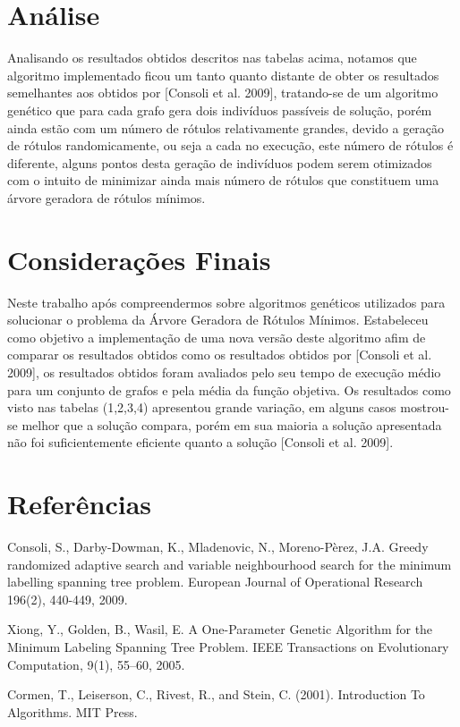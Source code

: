 \documentclass[12pt]{article}
\begin{document}
	\section{Análise}\label{sec:conclusao}

	Analisando os resultados obtidos descritos nas tabelas acima, notamos que algoritmo implementado ficou um tanto quanto distante de obter os resultados semelhantes aos obtidos por [Consoli et al. 2009], tratando-se de um algoritmo genético que para cada grafo gera dois indivíduos passíveis de solução, porém ainda estão com um número de rótulos relativamente grandes, devido a geração de rótulos randomicamente, ou seja a cada no execução, este número de rótulos é diferente, alguns pontos desta geração de indivíduos podem serem otimizados com o intuito de minimizar ainda mais número de rótulos que constituem uma árvore geradora de rótulos mínimos.

				
	\section{Considerações Finais}\label{sec:conclusao}

		Neste trabalho após compreendermos sobre algoritmos genéticos utilizados para solucionar o problema da Árvore Geradora de Rótulos Mínimos. Estabeleceu como objetivo a implementação de uma nova versão deste algoritmo afim de comparar os resultados obtidos como os resultados obtidos por [Consoli et al. 2009], os resultados obtidos foram avaliados pelo seu tempo de execução médio para um conjunto de grafos e pela média da função objetiva. Os resultados como visto nas tabelas (1,2,3,4) apresentou grande variação, em alguns casos mostrou-se melhor que a solução compara, porém em sua maioria a solução apresentada não foi suficientemente eficiente quanto a solução [Consoli et al. 2009]. 

	\section{Referências}\label{sec:referencias}

		\noindent [5] Consoli, S., Darby-Dowman, K., Mladenovic, N., Moreno-Pèrez, J.A. Greedy randomized adaptive search and variable neighbourhood search for the minimum labelling spanning tree problem. European Journal of Operational
		Research 196(2), 440-449, 2009.
		
		\noindent Xiong, Y., Golden, B., Wasil, E. A One-Parameter Genetic Algorithm for the Minimum Labeling Spanning Tree Problem. IEEE Transactions on Evolutionary Computation, 9(1), 55–60, 2005.

		\noindent Cormen, T., Leiserson, C., Rivest, R., and Stein, C. (2001). Introduction To Algorithms. MIT Press.
\end{document}
